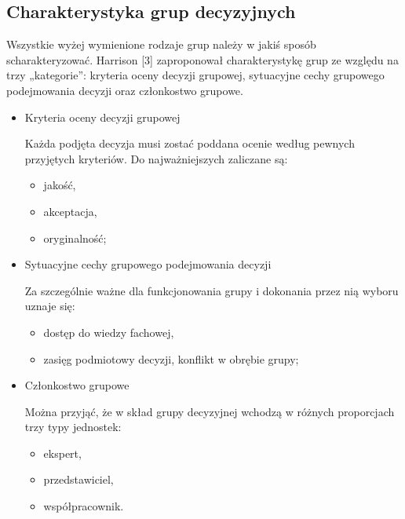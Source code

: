 \subsection{Charakterystyka grup decyzyjnych}
Wszystkie wyżej wymienione rodzaje grup należy w jakiś sposób scharakteryzować. 
Harrison [3] zaproponował charakterystykę grup ze względu na trzy „kategorie”: 
kryteria oceny decyzji grupowej, sytuacyjne cechy grupowego podejmowania decyzji oraz członkostwo grupowe.

\begin{itemize}
  \item Kryteria oceny decyzji grupowej
  
  Każda podjęta decyzja musi zostać poddana ocenie według pewnych przyjętych kryteriów. 
  Do najważniejszych zaliczane są:
  \begin{itemize}
    \item jakość, 
    \item akceptacja, 
    \item oryginalność;
  \end{itemize}
  
  \item Sytuacyjne cechy grupowego podejmowania decyzji
  
  Za szczególnie ważne dla funkcjonowania grupy i dokonania przez nią wyboru uznaje się:
  \begin{itemize}
    \item dostęp do wiedzy fachowej,
    \item zasięg podmiotowy decyzji,
    konflikt w obrębie grupy;
  \end{itemize}
  
  \item Członkostwo grupowe
  
  Można przyjąć, że w skład grupy decyzyjnej wchodzą w różnych proporcjach trzy typy jednostek:
  \begin{itemize}
    \item ekspert,
    \item przedstawiciel,
    \item współpracownik.
  \end{itemize}
\end{itemize}

